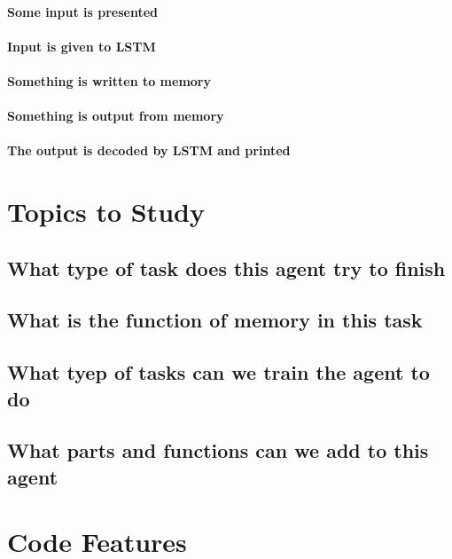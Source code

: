 \documentclass{article}
\begin{document}
\paragraph{Some input is presented}
\paragraph{Input is given to LSTM}
\paragraph{Something is written to memory}
\paragraph{Something is output from memory}
\paragraph{The output is decoded by LSTM and printed}


\section{Topics to Study}
\subsection{What type of task does this agent try to finish}
\subsection{What is the function of memory in this task}
\subsection{What tyep of tasks can we train the agent to do}
\subsection{What parts and functions can we add to this agent}

\section{Code Features}
\end{document}
